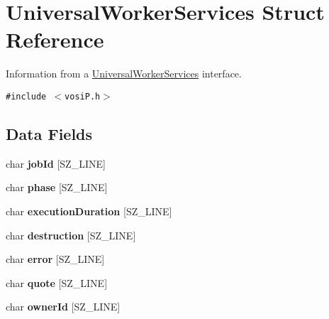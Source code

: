 \hypertarget{structUniversalWorkerServices}{
\section{UniversalWorkerServices Struct Reference}
\label{structUniversalWorkerServices}
}
Information from a \hyperlink{structUniversalWorkerServices}{UniversalWorkerServices} interface.  


{\tt \#include $<$vosiP.h$>$}

\subsection*{Data Fields}
\begin{CompactItemize}
\item 
\hypertarget{structUniversalWorkerServices_84c79fe26091701fb90277af6035d226}{
char \textbf{jobId} \mbox{[}SZ\_\-LINE\mbox{]}}
\label{structUniversalWorkerServices_84c79fe26091701fb90277af6035d226}

\item 
\hypertarget{structUniversalWorkerServices_5b663ec9dedf217fd8ef5aecd31737d9}{
char \textbf{phase} \mbox{[}SZ\_\-LINE\mbox{]}}
\label{structUniversalWorkerServices_5b663ec9dedf217fd8ef5aecd31737d9}

\item 
\hypertarget{structUniversalWorkerServices_831a4ca8f7674828c6dd8a7c88bd1b1b}{
char \textbf{executionDuration} \mbox{[}SZ\_\-LINE\mbox{]}}
\label{structUniversalWorkerServices_831a4ca8f7674828c6dd8a7c88bd1b1b}

\item 
\hypertarget{structUniversalWorkerServices_f0875b27036915253dae3959d7d437c7}{
char \textbf{destruction} \mbox{[}SZ\_\-LINE\mbox{]}}
\label{structUniversalWorkerServices_f0875b27036915253dae3959d7d437c7}

\item 
\hypertarget{structUniversalWorkerServices_a3dd88c3b578b8ef2cd6b9cf3453f970}{
char \textbf{error} \mbox{[}SZ\_\-LINE\mbox{]}}
\label{structUniversalWorkerServices_a3dd88c3b578b8ef2cd6b9cf3453f970}

\item 
\hypertarget{structUniversalWorkerServices_b3f577463e2fdee2b39b1e506ec9d793}{
char \textbf{quote} \mbox{[}SZ\_\-LINE\mbox{]}}
\label{structUniversalWorkerServices_b3f577463e2fdee2b39b1e506ec9d793}

\item 
\hypertarget{structUniversalWorkerServices_5e8016c04ebda1872bbde44d02e06d46}{
char \textbf{ownerId} \mbox{[}SZ\_\-LINE\mbox{]}}
\label{structUniversalWorkerServices_5e8016c04ebda1872bbde44d02e06d46}


\end{CompactItemize}
